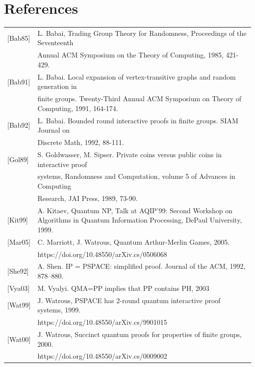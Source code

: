 \documentclass[12pt]{article}
\numberwithin{thm}{section}
\numberwithin{defn}{section}
\numberwithin{prop}{section}
\numberwithin{rmk}{section}
\begin{document}
	\section*{References}
	\begin{tabular}{ l l }
		\label{bab}[Bab85] & L. Babai, Trading Group Theory for Randomness, Proceedings of the Seventeenth\\& Annual ACM
		Symposium on the Theory of Computing, 1985, 421-429.\\
		\label{bab91}[Bab91] & L. Babai. Local expansion of vertex-transitive graphs and random generation in\\ & finite groups. Twenty-Third Annual ACM Symposium on Theory of Computing, 1991, 164-174.\\
		\label{bab92}[Bab92] & L. Babai. Bounded round interactive proofs in finite groups. SIAM Journal on\\& Discrete Math, 1992, 88-111.\\
		\label{gol89}[Gol89] & S. Goldwasser, M. Sipser. Private coins versus public coins in interactive proof \\& systems, Randomness and Computation, volume 5 of Advances in Computing\\& Research, JAI Press, 1989, 73-90.\\
		\label{kit99}[Kit99] & A. Kitaev, Quantum NP, Talk at AQIP’99: Second Workshop on Algorithms in Quantum
		Information Processing, DePaul University, 1999.\\
		\label{mar05}[Mar05] & C. Marriott, J. Watrous, Quantum Arthur-Merlin Games, 2005. \\&https://doi.org/10.48550/arXiv.cs/0506068\\
		\label{she92}[She92] & A. Shen. IP = PSPACE: simplified proof. Journal of the ACM, 1992, 878–880.\\
		\label{vya03}[Vya03] & M. Vyalyi. QMA=PP implies that PP contains PH, 2003\\
		\label{wat99}[Wat99] & J. Watrous, PSPACE has 2-round quantum interactive proof systems, 1999. \\&https://doi.org/10.48550/arXiv.cs/9901015\\
		\label{wat00}[Wat00] & J. Watrous, Succinct quantum proofs for properties of finite groups, 2000. \\&https://doi.org/10.48550/arXiv.cs/0009002\\
		
	\end{tabular}
	
		
\end{document}
